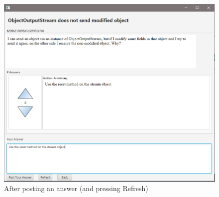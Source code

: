 \documentclass[11pt]{report}
\begin{document}
\begin{figure}[H]
  \centering
  \includegraphics[width=\textwidth,keepaspectratio=true]{img/user_manual/ScritturaRisposta2.png}
  \caption{After posting an answer (and pressing Refresh)}
  \label{fig:ScritturaRisposta2}
\end{figure}
\end{document}
